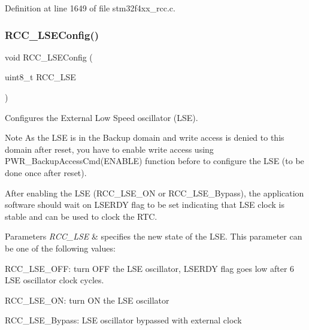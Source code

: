 Definition at line 1649 of file stm32f4xx\+\_\+rcc.\+c.

\mbox{\label{group___r_c_c_ga65209ab5c3589b249c7d70f978735ca6}} 
\subsubsection{\texorpdfstring{R\+C\+C\+\_\+\+L\+S\+E\+Config()}{RCC\_LSEConfig()}}
{\footnotesize\ttfamily void R\+C\+C\+\_\+\+L\+S\+E\+Config (\begin{DoxyParamCaption}\item[{uint8\+\_\+t}]{R\+C\+C\+\_\+\+L\+SE }\end{DoxyParamCaption})}



Configures the External Low Speed oscillator (L\+SE). 

\begin{DoxyNote}{Note}
As the L\+SE is in the Backup domain and write access is denied to this domain after reset, you have to enable write access using P\+W\+R\+\_\+\+Backup\+Access\+Cmd(\+E\+N\+A\+B\+L\+E) function before to configure the L\+SE (to be done once after reset). 

After enabling the L\+SE (R\+C\+C\+\_\+\+L\+S\+E\+\_\+\+ON or R\+C\+C\+\_\+\+L\+S\+E\+\_\+\+Bypass), the application software should wait on L\+S\+E\+R\+DY flag to be set indicating that L\+SE clock is stable and can be used to clock the R\+TC. 
\end{DoxyNote}

\begin{DoxyParams}{Parameters}
{\em R\+C\+C\+\_\+\+L\+SE} & specifies the new state of the L\+SE. This parameter can be one of the following values\+: \begin{DoxyItemize}
\item R\+C\+C\+\_\+\+L\+S\+E\+\_\+\+O\+FF\+: turn O\+FF the L\+SE oscillator, L\+S\+E\+R\+DY flag goes low after 6 L\+SE oscillator clock cycles. \item R\+C\+C\+\_\+\+L\+S\+E\+\_\+\+ON\+: turn ON the L\+SE oscillator \item R\+C\+C\+\_\+\+L\+S\+E\+\_\+\+Bypass\+: L\+SE oscillator bypassed with external clock \end{DoxyItemize}
\\
\hline
\end{DoxyParams}

